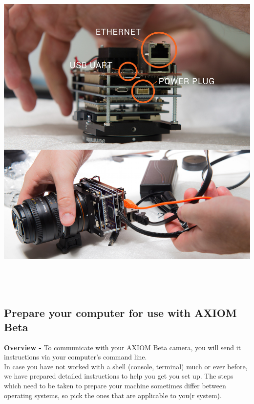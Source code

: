 \begin{center}
\includegraphics[height=17cm]{images/BetaGuide}\\
\end{center}

\subsection{Prepare your computer for use with AXIOM Beta}

\textbf{Overview -} To communicate with your AXIOM Beta camera, you will send it instructions via your computer's command line.\\

In case you have not worked with a shell (console, terminal) much or ever before, we have prepared detailed instructions to help you get you set up. The steps which need to 	be taken to prepare your machine sometimes differ between operating systems, so pick the ones that are applicable to you(r system). \\

